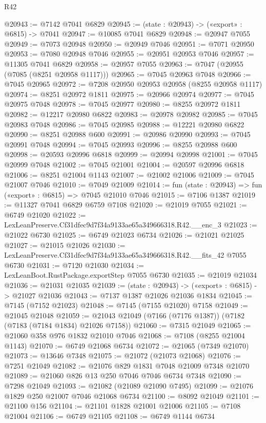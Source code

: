 \begin{lexlean}{R42}
\begin{coremodule}
{@20943 := @7142 @7041 @6829
@20945 := (state : @20943) -> («export» : @6815) -> @7041
@20947 := @10085 @7041 @6829
@20948 := @20947 @7055
@20949 := @7073 @20948
@20950 := @20949 @7046
@20951 := @7071 @20950
@20953 := @7080 @20948 @7046
@20955 := @20951 @20953 @7046
@20957 := @11305 @7041 @6829
@20958 := @20957 @7055
@20963 := @7047 (@20955 (@7085 (@8251 @20958 @1117)))
@20965 := @7045 @20963 @7048
@20966 := @7045 @20965
@20972 := @7208 @20950 @20953 @20958 (@8255 @20958 @1117)
@20974 := @8251 @20972 @1811
@20975 := @20966 @20974
@20977 := @7045 @20975 @7048
@20978 := @7045 @20977
@20980 := @8255 @20972 @1811
@20982 := @12217 @20980 @6822
@20983 := @20978 @20982
@20985 := @7045 @20983 @7048
@20986 := @7045 @20985
@20988 := @12221 @20980 @6822
@20990 := @8251 @20988 @600
@20991 := @20986 @20990
@20993 := @7045 @20991 @7048
@20994 := @7045 @20993
@20996 := @8255 @20988 @600
@20998 := @20593 @20996 @6818
@20999 := @20994 @20998
@21001 := @7045 @20999 @7048
@21002 := @7045 @21001
@21004 := @20597 @20996 @6818
@21006 := @8251 @21004 @1143
@21007 := @21002 @21006
@21009 := @7045 @21007 @7046
@21010 := @7049 @21009
@21014 := fun (state : @20943) => fun («export» : @6815) => @7045 @21010 @7046
@21015 := @7106 @1387
@21019 := @11327 @7041 @6829 @6759 @7108
@21020 := @21019 @7055
@21021 := @6749 @21020
@21022 := LexLeanPreserve.Cf31dfec9d7f34a9133ae65a349666318.R42.__enc_3
@21023 := @21022 @6730
@21025 := @6749 @21023 @6734
@21026 := @21021 @21025
@21027 := @21015 @21026
@21030 := LexLeanPreserve.Cf31dfec9d7f34a9133ae65a349666318.R42.__fits_42 @7055 @6730
@21031 := @7120 @21030
@21034 := LexLeanBoot.RustPackage.exportStep @7055 @6730
@21035 := @21019 @21034
@21036 := @21031 @21035
@21039 := (state : @20943) -> («export» : @6815) -> @21027 @21036
@21043 := @7137 @1387 @21026 @21036 @1834
@21045 := @7145 (@7152 @21023)
@21048 := @7145 (@7155 @21020) @7158
@21049 := @21045 @21048
@21059 := @21043 @21049 (@7166 (@7176 @1387)) (@7182 (@7183 (@7184 @1834) @21026 @7158))
@21060 := @7315 @21049
@21065 := @21060 @358 @976 @1832 @21010 @7046
@21068 := @7108 (@8255 @21004 @1143)
@21070 := @6749 @21068 @6734
@21072 := @21065 (@7349 @21070)
@21073 := @13646 @7348
@21075 := @21072 (@21073 @21068)
@21076 := @7251 @21049
@21082 := @21076 @829 @1831 @7048 @21009 @7348 @21070
@21089 := @21060 @826 @13 @250 @7046 @7046 @6734 @7348
@21090 := @7298 @21049
@21093 := @21082 (@21089 @21090 @7495)
@21099 := @21076 @1829 @250 @21007 @7046 @21068 @6734
@21100 := @8092 @21049
@21101 := @21100 @156
@21104 := @21101 @1828 @21001 @21006
@21105 := @7108 @21004
@21106 := @6749 @21105
@21108 := @6749 @1144 @6734
}
\end{coremodule}
\end{lexlean}
